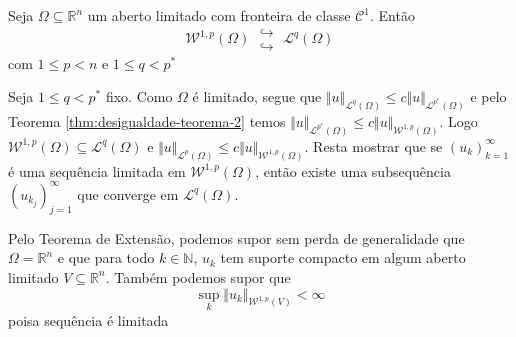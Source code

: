 \documentclass[a4paper, 11pt]{book}
\theoremstyle{definition}
\newcommand{\bN}{\mathbb{N}}
\newcommand{\bR}{\mathbb{R}}
\newcommand{\cC}{\mathcal{C}}
\newcommand{\cL}{\mathcal{L}}
\newcommand{\cW}{\mathcal{W}}
\newcommand{\doublehookrightarrow}{\;\substack{\hookrightarrow \\ \hookrightarrow}\;}
\begin{document}
\begin{tbox}
    Seja $\Omega \subseteq \bR^n$ um aberto limitado com fronteira de classe $\cC^1$.
    Então
    \[
        \cW^{1,p}(\Omega) \doublehookrightarrow \cL^q(\Omega)
    \]
    com $1 \leqslant p < n$ e $1 \leqslant q < p^*$
\end{tbox}
\begin{prf}
    Seja $1 \leqslant q < p^*$ fixo.
    Como $\Omega$ é limitado, segue que $\Vert u \Vert_{\cL^q(\Omega)} \leqslant c \Vert u \Vert_{\cL^{p^*}(\Omega)}$ e pelo Teorema \ref{thm:desigualdade-teorema-2} temos $\Vert u \Vert_{\cL^{p^*}(\Omega)} \leqslant c \Vert u \Vert_{\cW^{1,p}(\Omega)}$. Logo $\cW^{1,p}(\Omega) \subseteq \cL^q(\Omega)$ e $\Vert u \Vert_{\cL^p(\Omega)} \leqslant c \Vert u \Vert_{\cW^{1,p}(\Omega)}$.
    Resta mostrar que se $(u_k)_{k = 1}^\infty$ é uma sequência limitada em $\cW^{1,p}(\Omega)$, então existe uma subsequência $(u_{k_j})_{j=1}^\infty$ que converge em $\cL^q(\Omega)$.

    Pelo Teorema de Extensão, podemos supor sem perda de generalidade que $\Omega = \bR^n$ e que para todo $k \in \bN$, $u_k$ tem suporte compacto em algum aberto limitado $V \subseteq \bR^n$. 
    Também podemos supor que
    \begin{equation} \label{eq:supfinito}
        \sup_k \Vert u_k \Vert_{\cW^{1,p}(V)} < \infty
    \end{equation}
    poisa sequência é limitada


\end{prf}
\end{document}
